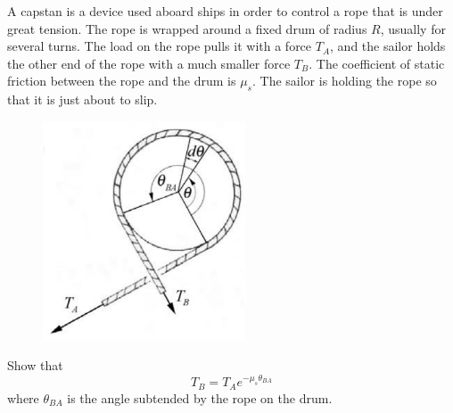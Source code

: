\begin{prbm}
A capstan is a device used aboard ships in order to control a rope that is under great tension. The rope is wrapped around a fixed drum of radius $R$, usually for several turns. The load on the rope pulls it with a force $T_A$, and the sailor holds the other end of the rope with a much smaller force $T_B$. The coefficient of static friction between the rope and the drum is $\mu_s$. The sailor is holding the rope so that it is just about to slip.

\begin{figure}[H]
    \centering
    \includegraphics[width=6cm]{images/Capstan.png}
\end{figure}

Show that \[ T_B = T_Ae^{-\mu_s \theta_{BA}}\]
where $\theta_{BA}$ is the angle subtended by the rope on the drum. 
\end{prbm}

